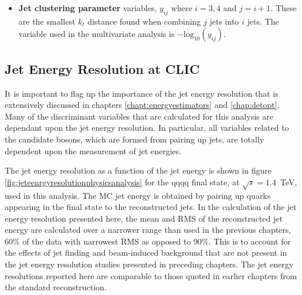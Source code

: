 \begin{itemize}
\item \textbf{Jet clustering parameter} variables, $y_{ij}$ where $i = 3,4$ and $j=i+1$.  These are the smallest $k_{t}$ distance found when combining $j$ jets into $i$ jets.  The variable used in the multivariate analysis is $-\text{log}_{10}(y_{ij})$.
\end{itemize}


\subsection{Jet Energy Resolution at CLIC} 
\label{sec:jetenergyresolution}
It is important to flag up the importance of the jet energy resolution that is extensively discussed in chapters \ref{chapt:energyestimators} and \ref{chap:detopt}.  Many of the discriminant variables that are calculated for this analysis are dependant upon the jet energy resolution.  In particular, all variables related to the candidate bosons, which are formed from pairing up jets, are totally dependent upon the measurement of jet energies.  

The jet energy resolution as a function of the jet energy is shown in figure \ref{fig:jeteenrgyresolutionphysicsanalysis} for the {\nu}{\nu}qqqq final state, at $\sqrt{s}=1.4$~TeV, used in this analysis.  The MC jet energy is obtained by pairing up quarks appearing in the final state to the reconstructed jets.  In the calculation of the jet energy resolution presented here, the mean and RMS of the reconstructed jet energy are calculated over a narrower range than used in the previous chapters, 60\% of the data with narrowest RMS as opposed to 90\%.  This is to account for the effects of jet finding and beam-induced background that are not present in the jet energy resolution studies presented in preceding chapters.  The jet energy resolutions reported here are comparable to those quoted in earlier chapters from the standard reconstruction.  

